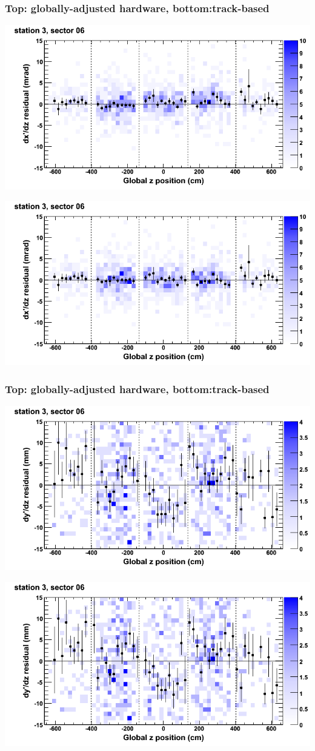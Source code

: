 \documentclass[compress]{beamer}
\begin{document}
\begin{frame}
\frametitle{Top: globally-adjusted hardware, bottom:track-based}
\includegraphics[width=0.7\linewidth]{NOV4_mapplots_HW/DTvsz_st3sec06_dxdz.png}

\includegraphics[width=0.7\linewidth]{NOV4_mapplots/DTvsz_st3sec06_dxdz.png}
\end{frame}

\begin{frame}
\frametitle{Top: globally-adjusted hardware, bottom:track-based}
\includegraphics[width=0.7\linewidth]{NOV4_mapplots_HW/DTvsz_st3sec06_dydz.png}

\includegraphics[width=0.7\linewidth]{NOV4_mapplots/DTvsz_st3sec06_dydz.png}
\end{frame}
\end{document}
